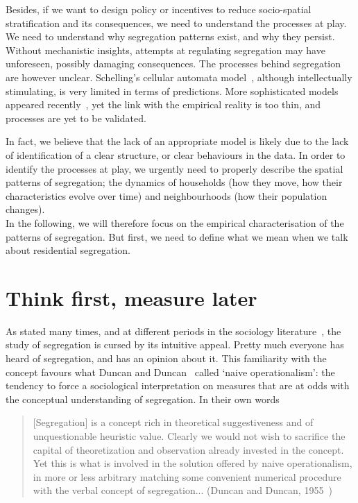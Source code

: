 Besides, if we want to design policy or incentives to reduce socio-spatial
stratification and its consequences, we need to understand the processes at
play. We need to understand why segregation patterns exist, and why they
persist. Without mechanistic insights, attempts at regulating segregation may
have unforeseen, possibly damaging consequences.  The processes behind
segregation are however unclear. Schelling's cellular automata
model~\cite{Schelling:1971}, although intellectually stimulating, is very
limited in terms of predictions. More sophisticated models appeared
recently~\cite{Brueckner:1999,Glaeser:2008,Gauvin:2013}, yet the link with the
empirical reality is too thin, and processes are yet to be validated.  

In fact, we believe that the lack of an appropriate model is likely due to the lack
of identification of a clear structure, or clear behaviours in the data. In
order to identify the processes at play, we urgently 
need to properly describe the spatial patterns of segregation; the
dynamics of households (how they move, how their characteristics evolve over
time) and neighbourhoods (how their population changes).\\

In the following, we will therefore focus on the empirical characterisation of
the patterns of segregation. But first, we need to define what we mean when we
talk about residential segregation.

\section{Think first, measure later}
\label{sec:introduction}

As stated many times, and at different periods in the sociology
literature~\cite{Duncan:1955m,James:1982,Massey:1988,Reardon:2002}, the study of
segregation is cursed by its intuitive appeal. Pretty much everyone has heard of
segregation, and has an opinion about it. This familiarity with the concept
favours what Duncan and Duncan~\cite{Duncan:1955m} called `naive operationalism':
the tendency to force a sociological interpretation on measures that are at odds
with the conceptual understanding of segregation. In their own words

\begin{quote}
    [Segregation] is a concept rich in theoretical suggestiveness and of
    unquestionable heuristic value. Clearly we would not wish to sacrifice the
    capital of theoretization and observation already invested in the concept.
    Yet this is what is involved in the solution offered by naive
    operationalism, in more or less arbitrary matching some convenient numerical
    procedure with the verbal concept of segregation... (Duncan and Duncan,
    1955~\cite{Duncan:1955m})
\end{quote}


